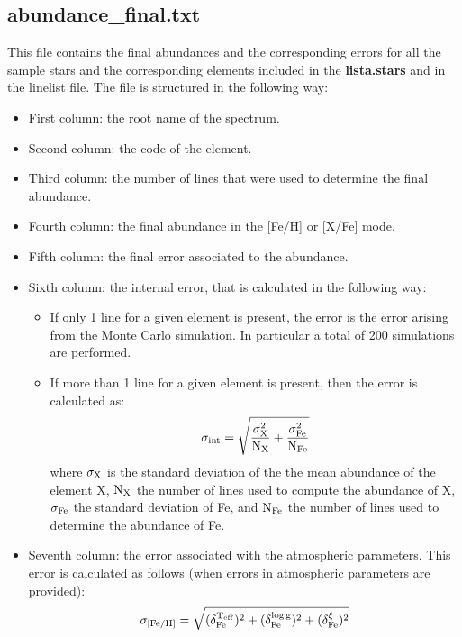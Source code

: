 \documentclass[modern]{aastex701}
\begin{document}
\subsection{abundance\_final.txt} \label{sect:abundance_final}
This file contains the final abundances and the corresponding errors for all the sample stars and the corresponding elements included in the \textbf{lista.stars} and in the linelist file. The file is structured in the following way:
\begin{itemize}
    \item First column: the root name of the spectrum.
    \item Second column: the code of the element.
    \item Third column: the number of lines that were used to determine the final abundance.
    \item Fourth column: the final abundance in the [Fe/H] or [X/Fe] mode.
    \item Fifth column: the final error associated to the abundance.
    \item Sixth column: the internal error, that is calculated in the following way: 
        \begin{itemize}
            \item If only 1 line for a given element is present, the error is the error arising from the Monte Carlo simulation. In particular a total of 200 simulations are performed.
            \item If more than 1 line for a given element is present, then the error is calculated as:
            \begin{equation}
                \rm \sigma_{int} = \sqrt{\frac{\sigma_X^2}{N_X} + \frac{\sigma_{Fe}^2}{N_{Fe}}} 
            \end{equation}
            where $\rm \sigma_X$ is the standard deviation of the the mean abundance of the element X, $\rm N_X$ the number of lines used to compute the abundance of X, $\rm \sigma_{Fe}$ the standard deviation of Fe, and $\rm N_{Fe}$ the number of lines used to determine the abundance of Fe.
        \end{itemize}
    \item Seventh column: the error associated with the atmospheric parameters. This error is calculated as follows (when errors in atmospheric parameters are provided):  
    \begin{equation} 
        \rm \sigma_{[Fe/H]}=\sqrt{(\delta_{Fe}^{T_{\mathrm{eff}}})^2+ (\delta_{Fe}^{\log g})^2 + (\delta_{Fe}^{\xi})^2}

\end{equation}
\end{itemize}
\end{document}
